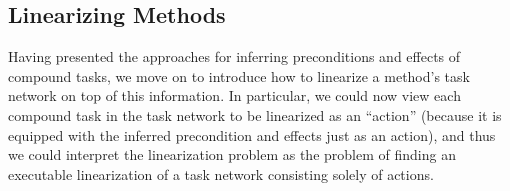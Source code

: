 \subsection{Linearizing Methods}

Having presented the approaches for inferring preconditions and effects of compound tasks, we move on to introduce how to linearize a method's task network on top of this information. In particular, we could now view each compound task in the task network to be linearized as an ``action'' (because it is equipped with the inferred precondition and effects just as an action), and thus we could interpret the linearization problem as the problem of finding an executable linearization of a task network consisting solely of actions. 